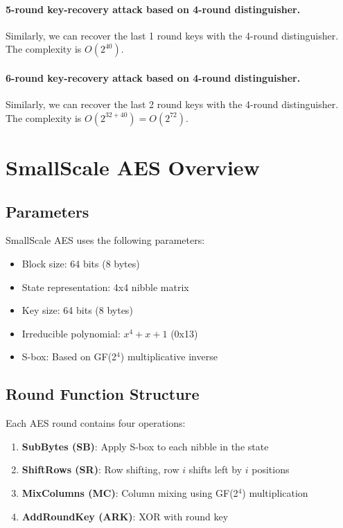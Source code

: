 \documentclass[12pt,journal=tosc, notanonymous]{iacrtrans}
\begin{document}
\paragraph{5-round key-recovery attack based on 4-round distinguisher.}

Similarly, we can recover the last 1 round keys with the 4-round distinguisher. 
The complexity is $O(2^{40})$.



\paragraph{6-round key-recovery attack based on 4-round distinguisher.}

Similarly, we can recover the last 2 round keys with the 4-round distinguisher. 
The complexity is $O(2^{32+40})=O(2^{72})$.



\section{SmallScale AES Overview}

\subsection{Parameters}

SmallScale AES uses the following parameters:

\begin{itemize}
    \item Block size: 64 bits (8 bytes)
    \item State representation: 4x4 nibble matrix
    \item Key size: 64 bits (8 bytes)
    \item Irreducible polynomial: $x^4 + x + 1$ (0x13)
    \item S-box: Based on GF(2$^4$) multiplicative inverse
\end{itemize}

\subsection{Round Function Structure}

Each AES round contains four operations:

\begin{enumerate}
    \item \textbf{SubBytes (SB)}: Apply S-box to each nibble in the state
    \item \textbf{ShiftRows (SR)}: Row shifting, row $i$ shifts left by $i$ positions
    \item \textbf{MixColumns (MC)}: Column mixing using GF(2$^4$) multiplication
    \item \textbf{AddRoundKey (ARK)}: XOR with round key
\end{enumerate}
\end{document}
